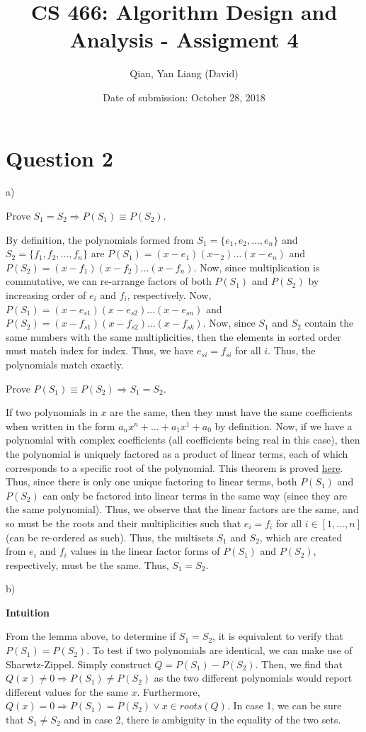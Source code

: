 \documentclass{article}
\title{CS 466: Algorithm Design and Analysis - Assigment 4}
\author{Qian, Yan Liang (David)}
\date{Date of submission: October 28, 2018}
\begin{document}
\newpage

\section{Question 2}

a)

Prove $S_1 = S_2 \Rightarrow P(S_1) \equiv P(S_2)$.

By definition, the polynomials formed from $S_1 = \{e_1, e_2, \ldots, e_n \}$ and $S_2 = \{f_1, f_2, \ldots, f_n\}$ are
$P(S_1) = (x - e_1)(x - _2)\ldots(x - e_n)$ and $P(S_2) = (x - f_1)(x - f_2)\ldots(x - f_n)$. Now, since multiplication
is commutative, we can re-arrange factors of both $P(S_1)$ and $P(S_2)$ by increasing order of $e_i$ and $f_i$,
respectively. Now, $P(S_1) = (x - e_{s1})(x - e_{s2})\ldots(x - e_{sn})$ and $P(S_2) = (x - f_{s1})(x - f_{s2})\ldots(x -
f_{sk})$.  Now, since $S_1$ and $S_2$ contain the same numbers with the same multiplicities, then the elements in sorted
order must match index for index. Thus, we have $e_{si} = f_{si}$ for all $i$. Thus, the polynomials match exactly.

Prove $P(S_1) \equiv P(S_2) \Rightarrow S_1 = S_2$.

If two polynomials in $x$ are the same, then they must have the same coefficients when written in the form $a_n x^n +
\ldots + a_1 x^1 + a_0$ by definition. Now, if we have a polynomial with complex coefficients (all coefficients being
real in this case), then the polynomial is uniquely factored as a product of linear terms, each of which corresponds to
a specific root of the polynomial. This theorem is proved
\href{http://mathonline.wikidot.com/the-factorization-of-polynomials-with-complex-coefficients}{here}. Thus, since there
is only one unique factoring to linear terms, both $P(S_1)$ and $P(S_2)$ can only be factored into linear terms in the
same way (since they are the same polynomial). Thus, we observe that the linear factors are the same, and so must be the
roots and their multiplicities such that $e_i = f_i$ for all $i \in [1, \ldots, n]$ (can be re-ordered as such). Thus,
the multisets $S_1$ and $S_2$, which are created from $e_i$ and $f_i$ values in the linear factor forms of $P(S_1)$ and
$P(S_2)$, respectively, must be the same. Thus, $S_1 = S_2$.


b)

\textbf{Intuition}

From the lemma above, to determine if $S_1 = S_2$, it is equivalent to verify that $P(S_1) = P(S_2)$. To test if two
polynomials are identical, we can make use of Sharwtz-Zippel. Simply construct $Q = P(S_1) - P(S_2)$. Then, we find that
$Q(x) \neq 0 \Rightarrow P(S_1) \neq P(S_2)$ as the two different polynomials would report different values for the same
$x$. Furthermore, $Q(x) = 0 \Rightarrow P(S_1) = P(S_2) \lor x \in roots(Q)$. In case 1, we can be sure that $S_1 \neq
S_2$ and in case 2, there is ambiguity in the equality of the two sets.
\end{document}
